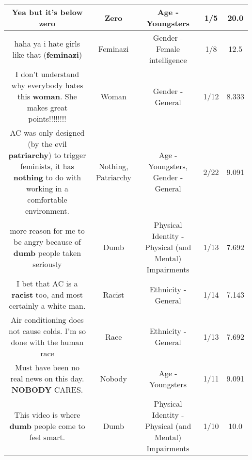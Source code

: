 \documentclass[11pt]{article}
\newlength\mylength
\begin{document}
\begin{center}
\begin{longtable}{|C{.65\mylength}|C{.30\mylength}|C{.12\mylength}|C{.12\mylength}|C{.12\mylength}|}
  \small Yea but it's below zero\normalsize   & Zero & Age - Youngsters & 1/5 & 20.0 \\  \hline
  \small haha ya i hate girls like that (\textbf{feminazi})\normalsize   & Feminazi & Gender - Female intelligence & 1/8 & 12.5 \\  \hline
  \small I don't understand why everybody hates this \textbf{woman}. She makes great points!!!!!!!!\normalsize   & Woman & Gender - General & 1/12 & 8.333 \\  \hline
  \small AC was only designed (by the evil \textbf{patriarchy}) to trigger feminists, it has \textbf{nothing} to do with working in a comfortable environment.\normalsize   & Nothing, Patriarchy & Age - Youngsters, Gender - General & 2/22 & 9.091 \\  \hline
  \small more reason for me to be angry because of \textbf{dumb} people taken seriously\normalsize   & Dumb & Physical Identity - Physical (and Mental) Impairments & 1/13 & 7.692 \\  \hline
  \small I bet that AC is a \textbf{racist} too, and most certainly a white man.\normalsize   & Racist & Ethnicity - General & 1/14 & 7.143 \\  \hline
  \small Air conditioning does not cause colds. I'm so done with the human race\normalsize   & Race & Ethnicity - General & 1/13 & 7.692 \\  \hline
  \small Must have been no real news on this day.  \textbf{NOBODY} CARES.\normalsize   & Nobody & Age - Youngsters & 1/11 & 9.091 \\  \hline
  \small This video is where \textbf{dumb} people come to feel smart.\normalsize   & Dumb & Physical Identity - Physical (and Mental) Impairments & 1/10 & 10.0 \\  \hline

\end{longtable}
\end{center}
\end{document}
